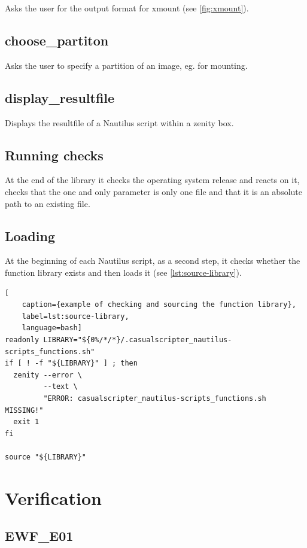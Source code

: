 Asks the user for the output format for xmount (see \cref{fig:xmount}).

\subsection{choose\_partiton}

Asks the user to specify a partition of an image, eg. for mounting.

\subsection{display\_resultfile}

Displays the resultfile of a Nautilus script within a zenity box.

\subsection{Running checks}

At the end of the library it checks the operating system release and reacts on it, checks that the one and only parameter is only one file and that it is an absolute path to an existing file.

\subsection{Loading}

At the beginning of each Nautilus script, as a second step, it checks whether the function library exists and then loads it (see \cref{lst:source-library}).

\begin{lstlisting}[
    caption={example of checking and sourcing the function library},
    label=lst:source-library,
    language=bash]
readonly LIBRARY="${0%/*/*}/.casualscripter_nautilus-scripts_functions.sh"
if [ ! -f "${LIBRARY}" ] ; then
  zenity --error \
         --text \
         "ERROR: casualscripter_nautilus-scripts_functions.sh MISSING!"
  exit 1
fi

source "${LIBRARY}"
\end{lstlisting}

\section{Verification}

\subsection{EWF\_E01}

